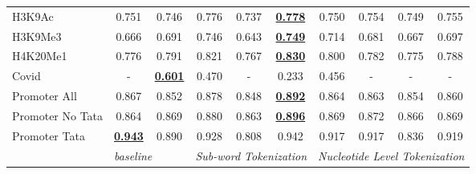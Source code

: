 \begin{table*}[h!]
\begin{center}
\begin{tabular}{l|cc|ccc|cccc}
H3K9Ac & 0.751 & 0.746 & 0.776 & 0.737 & {\ul \textbf{0.778}} & 0.750 & 0.754 & 0.749 & 0.755 \\
H3K9Me3 & 0.666 & 0.691 & 0.746 & 0.643 & {\ul \textbf{0.749}} & 0.714 & 0.681 & 0.667 & 0.697 \\
H4K20Me1 & 0.776 & 0.791 & 0.821 & 0.767 & {\ul \textbf{0.830}} & 0.800 & 0.782 & 0.775 & 0.788 \\
Covid & - & {\ul \textbf{0.601}} & 0.470 & - & 0.233 & 0.456 & - & - & - \\
Promoter All & 0.867 & 0.852 & 0.878 & 0.848 & {\ul \textbf{0.892}} & 0.864 & 0.863 & 0.854 & 0.860 \\
Promoter No Tata & 0.864 & 0.869 & 0.880 & 0.863 & {\ul \textbf{0.896}} & 0.869 & 0.872 & 0.866 & 0.869 \\
Promoter Tata & {\ul \textbf{0.943}} & 0.890 & 0.928 & 0.808 & 0.942 & 0.917 & 0.917 & 0.836 & 0.919 \\
\hline
 & \multicolumn{2}{l|}{\textit{baseline}} & \multicolumn{3}{c|}{\textit{Sub-word Tokenization}} & \multicolumn{4}{c}{\textit{Nucleotide Level Tokenization}} \\ \hline
\end{tabular}
\end{center}
\end{table*}